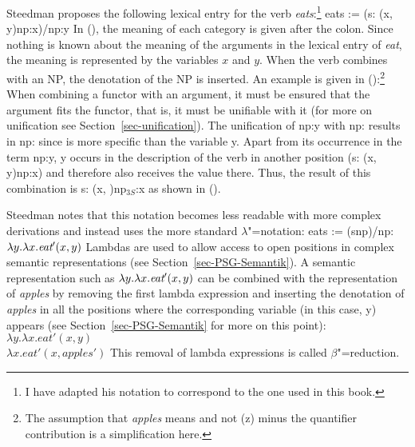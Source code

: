 Steedman proposes the following lexical entry for the verb \emph{eats}:\footnote{
 I have adapted his notation to correspond to the one used in this book.
}
\ea
eats := (s: (x, y)\bs np:x)/np:y
\z
In (), the meaning of each category is given after the colon. Since nothing is known about
the meaning of the arguments in the lexical entry of \emph{eat},
the meaning is represented by the variables $x$ and $y$. When the verb combines with an NP, the denotation of the NP is inserted. An example is given in ():\footnote{
The assumption that \emph{apples} means  and not (z) minus the quantifier contribution is a simplification here.
}
\ea
{}
\z
When combining a functor with an argument, it must be ensured that the argument fits the functor, that is, it must be unifiable with it
(for more on unification see Section~\ref{sec-unification}). The unification of np:y with np:  results in np:  since 
is more specific than the variable y. Apart from its occurrence in the term np:y, y occurs in the description of the verb in another position (s:
(x, y)\bs np:x) and therefore also receives the value 
there. Thus, the result of this combination is s: (x, )\bs np$_{3S}$:x 
as shown in ().

Steedman notes that this notation becomes less readable with more complex derivations and instead uses the more standard $\lambda$"=notation:
\ea
eats := (s\bs np)/np: $\lambda y.\lambda x.\textit{eat}'(x, y)$
\z
Lambdas are used to allow access to open positions in complex semantic representations (see Section~\ref{sec-PSG-Semantik}). A semantic representation such as
$\lambda
y.\lambda x.\textit{eat}'(x, y)$ can be combined with the representation of \emph{apples} by
removing the first lambda expression and inserting the denotation of \emph{apples}
in all the positions where the corresponding variable (in this case, y) appears (see Section~\ref{sec-PSG-Semantik} for more on this point):
\ea
$\lambda y.\lambda x.eat'(x, y)$ \\
$\lambda x.eat'(x, apples')$
\z
This removal of lambda expressions is called $\beta$"=reduction\label{Seite-beta-Reduktion}.

